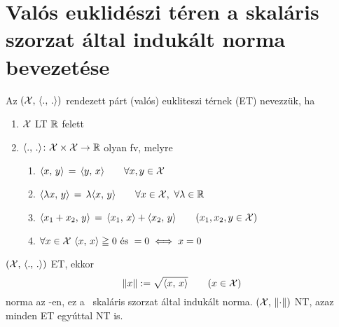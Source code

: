 \newpage
\section{Valós euklidészi téren a skaláris szorzat által indukált norma bevezetése}
\begin{de}
  Az $(\mathcal{X},\,\langle.,\,.\rangle)$ rendezett párt (valós) eukliteszi térnek (ET) nevezzük, ha
  \begin{enumerate}
  \item $\mathcal{X}$ LT $\mathbb{R}$ felett
  \item $\langle.,\,.\rangle\colon\mathcal{X}\times\mathcal{X}\to\mathbb{R}$ olyan fv, melyre
    \begin{enumerate}
    \item $\langle x,\,y\rangle \,=\,\langle y,\,x\rangle\qquad \forall x,y\in\mathcal{X}$
    \item $\skalar{\lambda x} y \,=\,\lambda\skalar x y\qquad \forall x\in\X,\ \forall\lambda\in\R$
    \item $\langle x_1+x_2,\,y\rangle \,=\,\langle x_1,\,x\rangle + \langle x_2,\,y\rangle \qquad (x_1,x_2,y\in\mathcal{X})$
    \item $\forall x\in\mathcal{X}\ \langle x,\,x\rangle \geqq0 \text{ és } =0\iff x=0$
    \end{enumerate}
  \end{enumerate}
\end{de}

\begin{te}
  $(\mathcal{X},\,\langle.,\,.\rangle)$ ET, ekkor
  \[ \Vert x\Vert := \sqrt{\langle x,\,x\rangle}\qquad(x\in\mathcal{X})\]
  norma az \X-en, ez a \Skalar\ skaláris szorzat által indukált norma. $(\mathcal{X},\,\left\Vert \cdot\right\Vert)$ NT, azaz minden ET egyúttal NT is.
\end{te}

